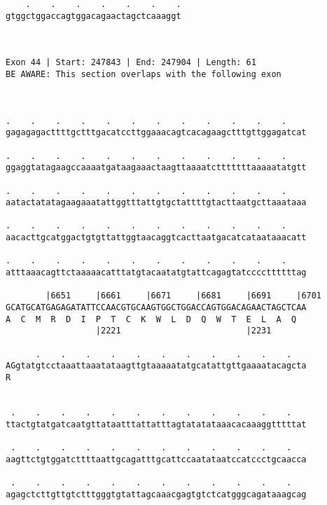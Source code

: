 \documentclass{article}
\begin{document}
\begin{Verbatim}
    .    .    .    .    .    .    .
gtggctggaccagtggacagaactagctcaaaggt
                                   
                                   
 
Exon 44 | Start: 247843 | End: 247904 | Length: 61
BE AWARE: This section overlaps with the following exon



.    .    .    .    .    .    .    .    .    .    .    .    
gagagagacttttgctttgacatccttggaaacagtcacagaagctttgttggagatcat
                                                            
.    .    .    .    .    .    .    .    .    .    .    .    
ggaggtatagaagccaaaatgataagaaactaagttaaaatctttttttaaaaatatgtt
                                                            
.    .    .    .    .    .    .    .    .    .    .    .    
aatactatatagaagaaatattggtttattgtgctattttgtacttaatgcttaaataaa
                                                            
.    .    .    .    .    .    .    .    .    .    .    .    
aacacttgcatggactgtgttattggtaacaggtcacttaatgacatcataataaacatt
                                                            
.    .    .    .    .    .    .    .    .    .    .    .    
atttaaacagttctaaaaacatttatgtacaatatgtattcagagtatccccttttttag
                                                            
        |6651     |6661     |6671     |6681     |6691     |6701
GCATGCATGAGAGATATTCCAACGTGCAAGTGGCTGGACCAGTGGACAGAACTAGCTCAA
A  C  M  R  D  I  P  T  C  K  W  L  D  Q  W  T  E  L  A  Q  
                  |2221                         |2231       
  
      .    .    .    .    .    .    .    .    .    .    .   
AGgtatgtcctaaattaaatataagttgtaaaaatatgcatattgttgaaaatacagcta
R                                                           
                                                            
  
 .    .    .    .    .    .    .    .    .    .    .    .   
ttactgtatgatcaatgttataatttattatttagtatatataaacacaaaggtttttat
                                                            
 .    .    .    .    .    .    .    .    .    .    .    .   
aagttctgtggatcttttaattgcagatttgcattccaatataatccatccctgcaacca
                                                            
 .    .    .    .    .    .    .    .    .    .    .    .   
agagctcttgttgtctttgggtgtattagcaaacgagtgtctcatgggcagataaagcag
                                                            

\end{Verbatim}
\end{document}
